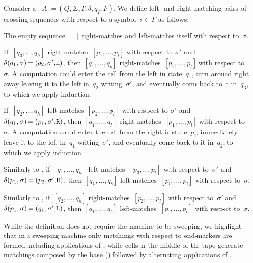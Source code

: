 \begin{defn}
	Consider a \kDLA~$A:=(Q,\Sigma,\Gamma,\delta,q_I,F)$.
	We define left- and right-matching pairs of crossing sequences with respect to a symbol~$\sigma\in\Gamma$ as follows:
	\begin{rules}
		\item \label{itm:crossmatchswepDLA-1} The empty sequence~$[~]$ right-matches and left-matches itself with respect to~$\sigma$.
		\item \label{itm:crossmatchswepDLA-2} If~$[q_3,\dots,q_h]$ right-matches~$[p_1,\dots,p_l]$ with respect to~$\sigma'$ and~$\delta(q_1,\sigma)=(q_2,\sigma',\mathtt L)$, then~$[q_1,\dots,q_h]$ right-matches~$[p_1,\dots,p_l]$ with respect to~$\sigma$.
		A computation could enter the cell from the left in state~$q_1$, turn around right away leaving it to the left in~$q_2$ writing~$\sigma'$, and eventually come back to it in~$q_3$, to which we apply induction.
		\item \label{itm:crossmatchswepDLA-3} If~$[q_2,\dots,q_h]$ left-matches~$[p_2,\dots,p_l]$ with respect to~$\sigma'$ and~$\delta(q_1,\sigma)=(p_1,\sigma',\mathtt R)$, then~$[q_1,\dots,q_h]$ right-matches~$[p_1,\dots,p_l]$ with respect to~$\sigma$.
		A computation could enter the cell from the right in state~$p_1$, immediately leave it to the left in~$q_1$ writing~$\sigma'$, and eventually come back to it in~$q_2$, to which we apply induction.
		\item \label{itm:crossmatchswepDLA-4} Similarly to , if~$[q_1,\dots,q_h]$ left-matches~$[p_3,\dots,p_l]$ with respect to~$\sigma'$ and~$\delta(p_1,\sigma)=(p_2,\sigma',\mathtt R)$, then~$[q_1,\dots,q_h]$ left-matches~$[p_1,\dots,p_l]$ with respect to~$\sigma$.
		\item \label{itm:crossmatchswepDLA-5} Similarly to , if~$[q_2,\dots,q_h]$ right-matches~$[p_2,\dots,p_l]$ with respect to~$\sigma'$ and~$\delta(p_1,\sigma)=(q_1,\sigma',\mathtt L)$, then~$[q_1,\dots,q_h]$ left-matches~$[p_1,\dots,p_l]$ with respect to~$\sigma$.
	\end{rules}
\end{defn}

While the definition does not require the machine to be sweeping, we highlight that in a sweeping machine only matchings with respect to end-markers are formed including applications of , while cells in the middle of the tape generate matchings composed by the base () followed by alternating applications of .

